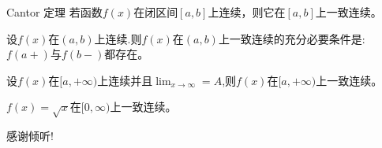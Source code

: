 \documentclass[10pt]{beamer}
\theoremstyle{remark}
\begin{document}
\begin{frame}
  \begin{block}{Cantor 定理}
    若函数$f(x)$在闭区间$[a,b]$上连续，则它在$[a,b]$上一致连续。
  \end{block}
  \begin{example}
    设$f(x)$在$(a,b)$上连续.则$f(x)$在$(a,b)$上一致连续的充分必要条件是:$f(a+)$与$f(b-)$都存在。
  \end{example}  
\begin{example}
  设$f(x)$在$[a,+\infty)$上连续并且$\lim_{x\to\infty} = A$,则$f(x)$在$[a,+\infty)$上一致连续。
\end{example}
\begin{example}
  $f(x)=\sqrt{x}$在$[0,\infty)$上一致连续。
\end{example}
\end{frame}



%


%

\begin{frame}[standout]
    感谢倾听!
\end{frame} 
\end{document}
